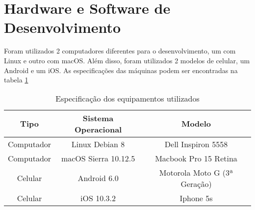 \section{Hardware e Software de Desenvolvimento}

Foram utilizados 2 computadores diferentes para o desenvolvimento, um com Linux e outro com macOS. Além disso, foram utilizados 2 modelos de celular, um Android e um iOS. As especificações das máquinas podem ser encontradas na tabela \ref{tab-hardware}

\begin{table}[h]
    \centering
    \caption{Especificação dos equipamentos utilizados}
    \label{tab-hardware}
    \begin{tabular}{ccc}
        \toprule
        \textbf{Tipo} & \textbf{Sistema Operacional} & \textbf{Modelo}              \\
        \midrule
        Computador    & Linux Debian 8               & Dell Inspiron 5558           \\
        Computador    & macOS Sierra 10.12.5         & Macbook Pro 15 Retina        \\
        Celular       & Android 6.0                  & Motorola Moto G (3ª Geração) \\
        Celular       & iOS 10.3.2                   & Iphone 5s                    \\
        \bottomrule
    \end{tabular}
\end{table}
